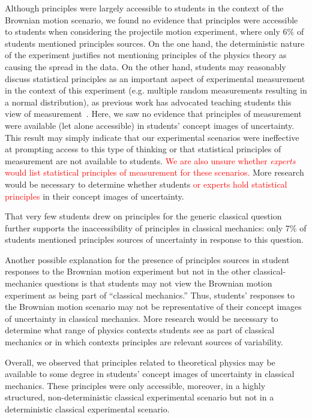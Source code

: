 \documentclass[english,aps,prstper,reprint,showpacs,longbibliography,superscriptaddress,nofootinbib]{revtex4-2}
\begin{document}
Although principles were largely accessible to students in the context of the Brownian motion scenario, we found no evidence that principles were accessible to students when considering the projectile motion experiment, where only 6\% of students mentioned principles sources. On the one hand, the deterministic nature of the experiment justifies not mentioning principles of the physics theory as causing the spread in the data. On the other hand, students may reasonably discuss statistical principles as an important aspect of experimental measurement in the context of this experiment (e.g. multiple random measurements resulting in a normal distribution), as previous work has advocated teaching students this view of measurement~\cite{Evangelinos1999,Evangelinos2002,Allie2003,Pillay2008,Buffler2008}. Here, we saw no evidence that principles of measurement were available (let alone accessible) in students' concept images of uncertainty. This result may simply indicate that our experimental scenarios were ineffective at prompting access to this type of thinking or that statistical principles of measurement are not available to students. \textcolor{red}{We are also unsure whether \emph{experts} would list statistical principles of measurement for these scenarios.} More research would be necessary to determine whether students \textcolor{red}{or experts hold statistical principles} in their concept images of uncertainty.

That very few students drew on principles for the generic classical question further supports the inaccessibility of principles in classical mechanics: only 7\% of students mentioned principles sources of uncertainty in response to this question.

Another possible explanation for the presence of principles sources in student responses to the Brownian motion experiment but not in the other classical-mechanics questions is that students may not view the Brownian motion experiment as being part of ``classical mechanics.'' Thus, students' responses to the Brownian motion scenario may not be representative of their concept images of uncertainty in classical mechanics. More research would be necessary to determine what range of physics contexts students see as part of classical mechanics or in which contexts principles are relevant sources of variability.

Overall, we observed that principles related to theoretical physics may be available to some degree in students' concept images of uncertainty in classical mechanics. These principles were only accessible, moreover, in a highly structured, non-deterministic classical experimental scenario but not in a deterministic classical experimental scenario.
\end{document}
